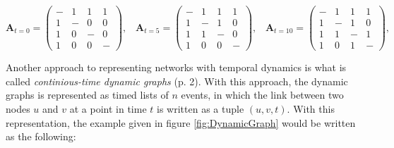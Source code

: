 \begin{equation}
    \textbf{A}_{t=0} = \begin{pmatrix}
                - & 1 & 1 & 1\\
                1 & - & 0 & 0\\
                1 & 0 & - & 0\\
                1 & 0 & 0 & -
                \end{pmatrix}, \hspace{10pt}
    \textbf{A}_{t=5} = \begin{pmatrix}
                - & 1 & 1 & 1\\
                1 & - & 1 & 0\\
                1 & 1 & - & 0\\
                1 & 0 & 0 & -
                \end{pmatrix}, \hspace{10pt}
    \textbf{A}_{t=10} = \begin{pmatrix}
                - & 1 & 1 & 1\\
                1 & - & 1 & 0\\
                1 & 1 & - & 1\\
                1 & 0 & 1 & -
                \end{pmatrix}, \hspace{10pt}
\end{equation}

Another approach to representing networks with temporal dynamics is what is called \textit{continious-time dynamic graphs} \cite{Rossi2020TEMPORALGRAPHS} (p. 2).
With this approach, the dynamic graphs is represented as timed lists of $n$ events, in which the link between two nodes $u$ and $v$ at a point in time $t$ is written as a tuple $(u, v, t)$.
With this representation, the example given in figure \ref{fig:DynamicGraph} would be written as the following:

